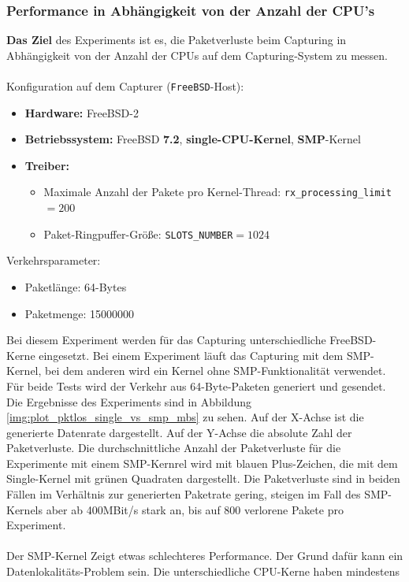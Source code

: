 \subsubsection*{Performance in Abhängigkeit von der Anzahl der CPU's}
\textbf{Das Ziel} des Experiments ist es, die Paketverluste beim Capturing 
in Abhängigkeit von der Anzahl der CPUs auf dem Capturing-System zu messen.\\\\
%
Konfiguration auf dem Capturer (\verb+FreeBSD+-Host): 
\begin{itemize}
	\item \textbf{Hardware:} FreeBSD-2	
	\item \textbf{Betriebssystem:} FreeBSD \textbf{7.2}, \textbf{single-CPU-Kernel}, \textbf{SMP}-Kernel
	\item \textbf{Treiber:} 
		\begin{itemize}
			\item Maximale Anzahl der Pakete pro Kernel-Thread: \verb+rx_processing_limit+$=200$
			\item Paket-Ringpuffer-Größe: \verb+SLOTS_NUMBER+$=1024$
		\end{itemize}
\end{itemize}
Verkehrsparameter:
\begin{itemize}
	\item Paketlänge: 64-Bytes
	\item Paketmenge: 15000000
\end{itemize}
%
Bei diesem Experiment werden für das Capturing unterschiedliche FreeBSD-Kerne
eingesetzt.  Bei einem Experiment läuft das Capturing mit dem SMP-Kernel, bei
dem anderen wird ein Kernel ohne SMP-Funktionalität verwendet. Für beide Tests
wird der Verkehr aus 64-Byte-Paketen generiert und gesendet. Die Ergebnisse des
Experiments sind in Abbildung \ref{img:plot_pktlos_single_vs_smp_mbs} zu sehen.
Auf der X-Achse ist die generierte Datenrate dargestellt. Auf der Y-Achse die
absolute Zahl der Paketverluste. Die durchschnittliche Anzahl der Paketverluste
für die Experimente mit einem SMP-Kernrel wird mit blauen Plus-Zeichen, die mit
dem Single-Kernel mit grünen Quadraten dargestellt. Die Paketverluste sind in
beiden Fällen im Verhältnis zur generierten Paketrate gering, steigen im Fall
des SMP-Kernels aber ab 400MBit/s stark an, bis auf 800 verlorene Pakete pro
Experiment.\\\\ 
%
Der SMP-Kernel Zeigt etwas schlechteres Performance. Der Grund dafür kann ein
Datenlokalitäts-Problem sein. Die unterschiedliche CPU-Kerne haben mindestens

